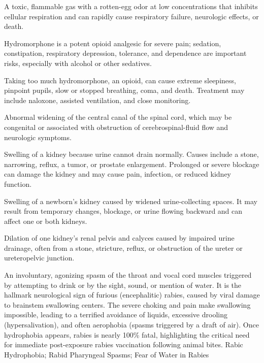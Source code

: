  A toxic, flammable gas with a rotten-egg odor at low concentrations that inhibits cellular respiration and can rapidly cause respiratory failure, neurologic effects, or death.

 Hydromorphone is a potent opioid analgesic for severe pain; sedation, constipation, respiratory depression, tolerance, and dependence are important risks, especially with alcohol or other sedatives.

 Taking too much hydromorphone, an opioid, can cause extreme sleepiness, pinpoint pupils, slow or stopped breathing, coma, and death. Treatment may include naloxone, assisted ventilation, and close monitoring.

 Abnormal widening of the central canal of the spinal cord, which may be congenital or associated with obstruction of cerebrospinal-fluid flow and neurologic symptoms.

 Swelling of a kidney because urine cannot drain normally. Causes include a stone, narrowing, reflux, a tumor, or prostate enlargement. Prolonged or severe blockage can damage the kidney and may cause pain, infection, or reduced kidney function.

 Swelling of a newborn’s kidney caused by widened urine-collecting spaces. It may result from temporary changes, blockage, or urine flowing backward and can affect one or both kidneys.

 Dilation of one kidney’s renal pelvis and calyces caused by impaired urine drainage, often from a stone, stricture, reflux, or obstruction of the ureter or ureteropelvic junction.

 An involuntary, agonizing spasm of the throat and vocal cord muscles triggered by attempting to drink or by the sight, sound, or mention of water. It is the hallmark neurological sign of furious (encephalitic) rabies, caused by viral damage to brainstem swallowing centers. The severe choking and pain make swallowing impossible, leading to a terrified avoidance of liquids, excessive drooling (hypersalivation), and often aerophobia (spasms triggered by a draft of air). Once hydrophobia appears, rabies is nearly 100\% fatal, highlighting the critical need for immediate post-exposure rabies vaccination following animal bites.
\synonyms
Rabic Hydrophobia; Rabid Pharyngeal Spasms; Fear of Water in Rabies

